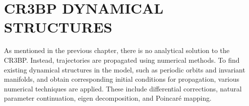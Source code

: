 \chapter{CR3BP DYNAMICAL STRUCTURES}

As mentioned in the previous chapter, there is no analytical solution to the
CR3BP. Instead, trajectories are propagated using numerical methods. To find
existing dynamical structures in the model, such as periodic orbits and
invariant manifolds, and obtain corresponding initial conditions for
propagation, various numerical techniques are applied. These include
differential corrections, natural parameter continuation, eigen decomposition,
and Poincar\'e mapping.





